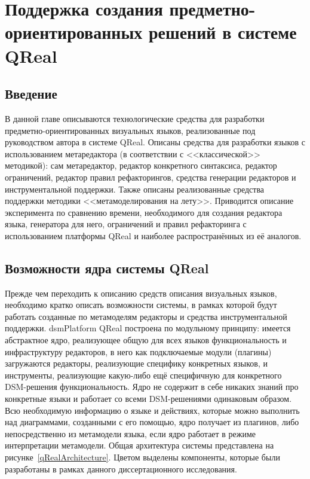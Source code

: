 \chapter{Поддержка создания предметно-ориентированных решений в системе QReal}
\label{chapter:implementation}

\section{Введение}
В данной главе описываются технологические средства для разработки предметно-ориентированных 
визуальных языков, реализованные под руководством автора в системе QReal. Описаны 
средства для разработки языков с использованием метаредактора (в соответствии с <<классической>> 
методикой): сам метаредактор, редактор конкретного синтаксиса, редактор ограничений, 
редактор правил рефакторингов, средства генерации редакторов и инструментальной поддержки. 
Также описаны реализованные средства поддержки методики <<метамоделирования на лету>>.
Приводится описание эксперимента по сравнению времени, необходимого для создания редактора
языка, генератора для него, ограничений и правил рефакторинга с использованием платформы QReal 
и наиболее распространённых из её аналогов.

\section{Возможности ядра системы QReal}
Прежде чем переходить к описанию средств описания визуальных языков, необходимо кратко 
описать возможности системы, в рамках которой будут работать созданные по метамоделям 
редакторы и средства инструментальной поддержки. \ac{dsmPlatform} QReal построена по 
модульному принципу: имеется абстрактное ядро, реализующее общую для всех языков функциональность 
и инфраструктуру редакторов, в него как подключаемые модули (плагины) загружаются редакторы, 
реализующие специфику конкретных языков, и инструменты, реализующие какую-либо ещё 
специфичную для конкретного \ac{DSM}-решения функциональность. Ядро не содержит в себе 
никаких знаний про конкретные языки и работает со всеми \ac{DSM}-решениями одинаковым образом. 
Всю необходимую информацию о языке и действиях, которые можно выполнить над диаграммами, 
созданными с его помощью, ядро получает из плагинов, либо непосредственно из метамодели 
языка, если ядро работает в режиме интерпретации метамодели. Общая архитектура системы 
представлена на рисунке~\ref{qRealArchitecture}. Цветом выделены компоненты, которые были разработаны
в рамках данного диссертационного исследования.

